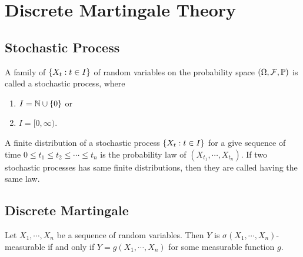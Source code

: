\chapter{Discrete Martingale Theory}

\section{Stochastic Process}

\begin{defn}
    A family of $\left\{X_t: t \in I\right\}$ of random variables on the probability space $(\Omega, \mathcal{F},\mathbb{P})$ is called a stochastic process, where
    \begin{enumerate}[label=(\arabic{*})]
        \item $I = \mathbb{N} \cup \left\{0\right\}$ or
        \item $I = [0,\infty)$.
    \end{enumerate}
\end{defn}

\begin{defn}
    A finite distribution of a stochastic process $\left\{X_t: t \in I\right\}$ for a give sequence of time $0 \leq t_1 \leq t_2 \leq \cdots \leq t_n$ is the probability law of $(X_{t_1},\cdots,X_{t_n})$. If two stochastic processes has same finite distributions, then they are called having the same law.
\end{defn}

\section{Discrete Martingale}

\begin{thm}
    Let $X_1,\cdots,X_n$ be a sequence of random variables. Then $Y$ is $\sigma(X_1,\cdots,X_n)$-measurable if and only if $Y = g(X_1,\cdots,X_n)$ for some measurable function $g$.
\end{thm}



